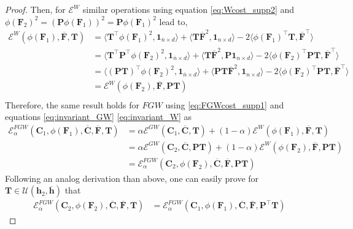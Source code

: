 \documentclass{article}
\newcommand{\scalar}[2]{\langle #1 , #2 \rangle}
\def\vh{{\bm{h}}}
\def\mC{{\bm{C}}}
\def\mF{{\bm{F}}}
\def\mP{{\bm{P}}}
\def\mT{{\bm{T}}}
\begin{document}
{\begin{proof}
 Then, for $\mathcal{E}^W$ similar operations using equation \ref{eq:Wcost_supp2} and $\phi(\mF_2)^2 = (\mP \phi(\mF_1))^2 = \mP \phi(\mF_1)^2$  lead to,
\begin{equation}\label{eq:invariant_W}
\begin{split}
\mathcal{E}^W(\phi(\mF_1), \overline{\mF}, \mT)&= \scalar{\mT^\top \phi(\mF_1)^2 }{ \bm{1}_{\overline{n} \times d}} + \scalar{\mT \overline{\mF}^2 }{ \bm{1}_{n \times d}} - 2 \scalar{\phi(\mF_1)^\top \mT}{ \overline{\mF}^\top}\\
&= \scalar{\mT^\top \mP^\top \phi(\mF_2)^2 }{ \bm{1}_{\overline{n} \times d}} + \scalar{\mT\overline{\mF}^2 }{ \mP \bm{1}_{n \times d}} - 2 \scalar{\phi(\mF_2)^\top \mP \mT}{ \overline{\mF}^\top}\\
&= \scalar{(\mP\mT)^\top  \phi(\mF_2)^2 }{ \bm{1}_{\overline{n} \times d}} + \scalar{\mP\mT\overline{\mF}^2 }{ \bm{1}_{n \times d}} - 2 \scalar{\phi(\mF_2)^\top \mP \mT}{ \overline{\mF}^\top}\\
& = \mathcal{E}^W(\phi(\mF_2), \overline{\mF}, \mP\mT)\\
\end{split}
\end{equation}
Therefore, the same result holds for $FGW$ using \ref{eq:FGWcost_supp1} and equations \ref{eq:invariant_GW} \ref{eq:invariant_W} as
\begin{equation} \label{eq:invariant_FGW}
\begin{split}
\mathcal{E}^{FGW}_\alpha(\mC_1, \phi(\mF_1), \overline{\mC}, \overline{\mF}, \mT) &= \alpha \mathcal{E}^{GW}(\mC_1,\overline{\mC},  \mT) + (1 -\alpha)\mathcal{E}^{W}(\phi(\mF_1),\overline{\mF},  \mT) \\
&= \alpha \mathcal{E}^{GW}(\mC_2,\overline{\mC},  \mP\mT) + (1 -\alpha)\mathcal{E}^{W}(\phi(\mF_2),\overline{\mF},  \mP\mT) \\
&=\mathcal{E}^{FGW}_\alpha(\mC_2, \phi(\mF_2), \overline{\mC}, \overline{\mF}, \mP\mT)
\end{split}
\end{equation}
Following an analog derivation than above, one can easily prove for $\mT \in \mathcal{U}(\vh_2, \overline{\vh})$ that
\begin{equation} \label{eq:invariant_FGW_2}
\begin{split}
\mathcal{E}^{FGW}_\alpha(\mC_2, \phi(\mF_2), \overline{\mC}, \overline{\mF}, \mT) &= \mathcal{E}^{FGW}_\alpha(\mC_1, \phi(\mF_1), \overline{\mC}, \overline{\mF}, \mP^\top\mT)
\end{split}
\end{equation}


\end{proof}}
\end{document}
